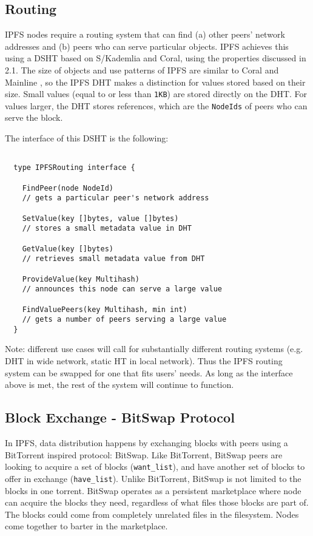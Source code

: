 \documentclass{sig-alternate}
\begin{document}
\subsection{Routing}

IPFS nodes require a routing system that can find (a) other peers' network addresses and (b) peers who can serve particular objects. IPFS achieves this using a DSHT based on S/Kademlia and Coral, using the properties discussed in 2.1. The size of objects and use patterns of IPFS are similar to Coral \cite{Coral} and Mainline \cite{Mainline}, so the IPFS DHT makes a distinction for values stored based on their size. Small values (equal to or less than \texttt{1KB}) are stored directly on the DHT. For values larger, the DHT stores references, which are the \texttt{NodeIds} of peers who can serve the block.

The interface of this DSHT is the following:

\begin{verbatim}

  type IPFSRouting interface {

    FindPeer(node NodeId)
    // gets a particular peer's network address

    SetValue(key []bytes, value []bytes)
    // stores a small metadata value in DHT

    GetValue(key []bytes)
    // retrieves small metadata value from DHT

    ProvideValue(key Multihash)
    // announces this node can serve a large value

    FindValuePeers(key Multihash, min int)
    // gets a number of peers serving a large value
  }
\end{verbatim}

Note: different use cases will call for substantially different routing systems (e.g. DHT in wide network, static HT in local network). Thus the IPFS routing system can be swapped for one that fits users' needs. As long as the interface above is met, the rest of the system will continue to function.

\subsection{Block Exchange - BitSwap Protocol}

In IPFS, data distribution happens by exchanging blocks with peers using a
BitTorrent inspired protocol: BitSwap. Like BitTorrent, BitSwap peers are
looking to acquire a set of blocks (\texttt{want\_list}), and have another set
of blocks to offer in exchange (\texttt{have\_list}).
Unlike BitTorrent, BitSwap is not limited to the blocks in one torrent.
BitSwap operates as a persistent marketplace where node can acquire the
blocks they need, regardless of what files those blocks are part of. The
blocks could come from completely unrelated files in the filesystem.
Nodes come together to barter in the marketplace.
\end{document}

